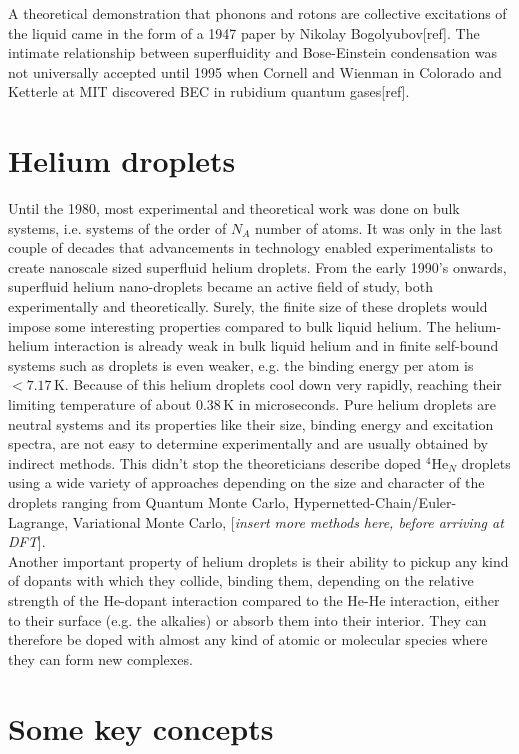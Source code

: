 \documentclass[11pt,a4paper,twoside]{article}
\newcommand{\unit}[1]{\,\mathrm{#1}}
\begin{document}
		A theoretical demonstration that phonons and rotons are collective excitations of the liquid came in the form of a 1947 paper by Nikolay Bogolyubov[ref]. The intimate relationship between superfluidity and Bose-Einstein condensation was not universally accepted until 1995 when Cornell and Wienman in Colorado and Ketterle at MIT discovered BEC in rubidium quantum gases[ref].\\
	
	\section{Helium droplets}
		Until the 1980, most experimental and theoretical work was done on bulk systems, i.e. systems of the order of $N_A$ number of atoms. It was only in the last couple of decades that advancements in technology enabled experimentalists to create nanoscale sized superfluid helium droplets. From the early 1990's onwards, superfluid helium nano-droplets became an active field of study, both experimentally and theoretically. Surely, the finite size of these droplets would impose some interesting properties compared to bulk liquid helium. The helium-helium interaction is already weak in bulk liquid helium and in finite self-bound systems such as droplets is even weaker, e.g. the binding energy per atom is $<\!7.17\unit{K}$. Because of this helium droplets cool down very rapidly, reaching their limiting temperature of about $0.38\unit{K}$ in microseconds. Pure helium droplets are neutral systems and its properties like their size, binding energy and excitation spectra, are not easy to determine experimentally and are usually obtained by indirect methods. This didn't stop the theoreticians describe doped $^4$He$_N$ droplets using a wide variety of approaches depending on the size and character of the droplets ranging from Quantum Monte Carlo, Hypernetted-Chain/Euler-Lagrange, Variational Monte Carlo, [\emph{insert more methods here, before arriving at DFT}].\\
	
		Another important property of helium droplets is their ability to pickup any kind of dopants with which they collide, binding them, depending on the relative strength of the He-dopant interaction compared to the He-He interaction, either to their surface (e.g. the alkalies) or absorb them into their interior. They can therefore be doped with almost any kind of atomic or molecular species where they can form new complexes.
	
	\section{Some key concepts}
\end{document}
